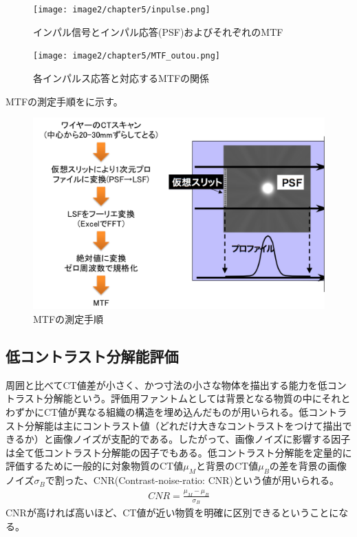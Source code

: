 \begin{figure}[H]
 \begin{center}
 \texttt{[image: image2/chapter5/inpulse.png]} 
 \end{center}
 \caption{インパル信号とインパル応答(PSF)およびそれぞれのMTF}
 \label{fig:inpulse}
\end{figure}

\begin{figure}[H]
 \begin{center}
 \texttt{[image: image2/chapter5/MTF\_outou.png]} 
 \end{center}
 \caption{各インパルス応答と対応するMTFの関係}
 \label{fig:MTF_outou}
\end{figure}

MTFの測定手順をに示す。

\begin{figure}[H]
 \begin{center}
 \includegraphics[bb=0.000000 0.000000 621.548619 408.446235,width=1\hsize]{image2/chapter5/MTF_method.png} 
 \end{center}
 \caption{MTFの測定手順}
 \label{fig:MTF_method}
\end{figure}
\fi

\subsection{低コントラスト分解能評価}
周囲と比べてCT値差が小さく、かつ寸法の小さな物体を描出する能力を低コントラスト分解能という。評価用ファントムとしては背景となる物質の中にそれとわずかにCT値が異なる組織の構造を埋め込んだものが用いられる。低コントラスト分解能は主にコントラスト値（どれだけ大きなコントラストをつけて描出できるか）と画像ノイズが支配的である。したがって、画像ノイズに影響する因子は全て低コントラスト分解能の因子でもある。低コントラスト分解能を定量的に評価するために一般的に対象物質のCT値$\mu_M$と背景のCT値$\mu_B$の差を背景の画像ノイズ$\sigma_B$で割った、CNR(Contrast-noise-ratio: CNR)という値が用いられる。
\begin{align}
CNR = \frac{\mu_M-\mu_B}{\sigma_B}
\end{align}
CNRが高ければ高いほど、CT値が近い物質を明確に区別できるということになる。


